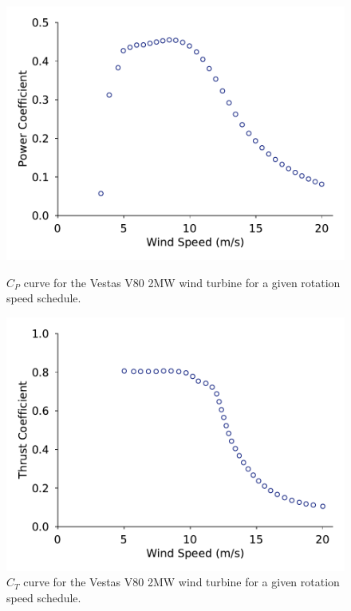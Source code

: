 \documentclass{jpconf}
\begin{document}
\begin{figure}[h!]
	\centering
	\begin{minipage}[t]{0.48\textwidth}
		\centering
		\includegraphics[width=\textwidth, trim={0cm 0cm 0cm 0cm}, clip]{inputs/cp_curve_v80}
		\caption{$C_P$ curve for the Vestas V80 2MW wind turbine \cite{niayifar2016} for a given rotation speed schedule.}
		\label{fig:cp}
	\end{minipage}\hspace{1pc}%
	\begin{minipage}[t]{0.48\textwidth}
		\centering
		\includegraphics[width=\textwidth]{inputs/ct_curve_v80.pdf}
		\caption{$C_T$ curve for the Vestas V80 2MW wind turbine \cite{niayifar2016} for a given rotation speed schedule.}
		\label{fig:ct}
	\end{minipage} 
\end{figure}
\end{document}
